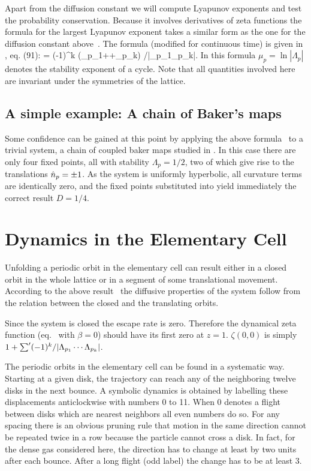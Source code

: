 \documentclass[pre,preprint,groupedaddress,showpacs,showkeys]{revtex4}
\begin{document}
Apart from the diffusion constant we will compute Lyapunov
exponents and test the
probability conservation. Because it involves derivatives of zeta functions
the formula for the largest Lyapunov exponent takes a similar form as the one
for the diffusion constant above~.
The formula (modified for continuous time)
is given in , eq. (91):
\beq \lambda=
                       {\sumprime (-1)^k (\tau_{p_1}+\cdots +\tau_{p_k})
      /|\Lambda_{p_1}\cdots \Lambda_{p_k}|}\;. \label{eqliap} \eeq
In this formula $\mu_p=\ln|\Lambda_p|$ denotes the stability exponent of a
cycle. Note that all quantities involved here are invariant under the symmetries
of the lattice.

\subsection{A simple example: A chain of Baker's maps}
Some confidence can be gained at this point by applying the above
formula~ to a trivial system, a chain of coupled
baker maps studied in .
In this case there are only four fixed points, all with
stability $\Lambda_p=1/2$, two of
which give rise to the translations $\hat n_{p}=\pm 1$.
As the system is
uniformly hyperbolic, all curvature terms are identically zero,
and the fixed points substituted into  yield
immediately the correct result $D=1/4$.

\section{Dynamics in the Elementary Cell} \label{CELL}
Unfolding a periodic orbit in the elementary cell can
result either in a closed orbit in the whole lattice or in a segment of
some translational movement. According to the above result~
the diffusive properties of the system follow from the relation between
the closed and the translating orbits.

Since the system is closed the escape rate is zero. Therefore
the dynamical zeta function (eq.~ with $\beta=0$) should have its
first zero at $z=1$. $\zeta(0,0)$
is simply $1+\mathop{{\sum}'} (-1)^k/|\Lambda_{p_1}\cdots \Lambda_{p_k}|$.

The periodic orbits in the elementary cell can be found in a systematic way.
Starting at a given disk, the trajectory can reach any of the neighboring
twelve disks in the next bounce.
A symbolic dynamics is obtained by labelling
these displacements anticlockwise with numbers 0 to 11. When 0 denotes
a flight between disks which are nearest neighbors all even numbers do so. For
any spacing there is an obvious pruning rule that motion
in the same direction cannot be repeated
twice in a row because the particle cannot cross a disk. In fact, for the
dense gas considered here,
the direction has to change at least by two units after each bounce.
After a long flight (odd label) the change has to be at least 3.
\end{document}
